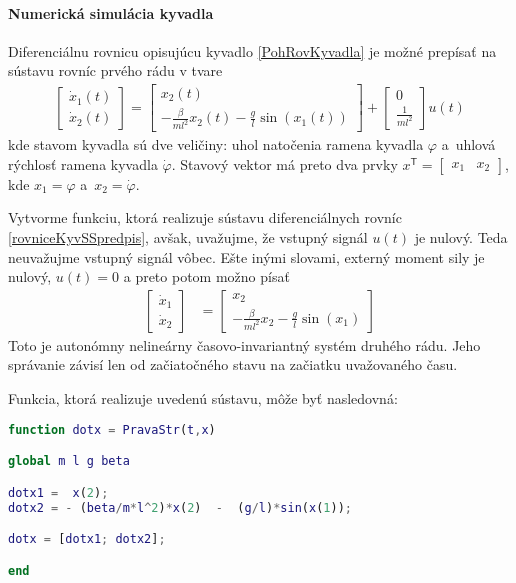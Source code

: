 \documentclass[a4paper, 10pt, ]{article}
\begin{document}
\paragraph{Numerická simulácia kyvadla}

Diferenciálnu rovnicu opisujúcu kyvadlo \eqref{PohRovKyvadla} je možné prepísať na sústavu rovníc prvého rádu v tvare
\begin{align} \label{rovniceKyvSSpredpis}
    \begin{bmatrix} \dot x_1(t) \\ \dot x_2(t)  \end{bmatrix} = \begin{bmatrix} x_2(t) \\ -\frac{\beta}{ml^2} x_2(t) - \frac{g}{l} \sin\left( x_1(t) \right)  \end{bmatrix} + \begin{bmatrix} 0 \\ \frac{1}{ml^2} \end{bmatrix} u(t)
\end{align}
kde stavom kyvadla sú dve veličiny: uhol natočenia ramena kyvadla $\varphi$ a~uhlová rýchlosť ramena kyvadla $\dot\varphi$. Stavový vektor má preto dva prvky $x^{\mathsf{T}} = \begin{bmatrix} x_1 & x_2	\end{bmatrix}$, kde $x_1 = \varphi$ a~$x_2 = \dot\varphi$.

Vytvorme funkciu, ktorá realizuje sústavu diferenciálnych rovníc \eqref{rovniceKyvSSpredpis}, avšak, uvažujme, že vstupný signál $u(t)$ je nulový. Teda neuvažujme vstupný signál vôbec. Ešte inými slovami, externý moment sily je nulový, $u(t) = 0$ a preto potom možno písať
\begin{align} \label{fajnVektRov0}
	\begin{bmatrix}
		\dot{x}_1 \\ \dot{x}_2
	\end{bmatrix}
	&=
	\begin{bmatrix}
		x_2 \\ - \frac{\beta}{ml^2} x_2 - \frac{g}{l} \sin(x_1)
	\end{bmatrix}
\end{align}
Toto je autonómny nelineárny časovo-invariantný systém druhého rádu. Jeho správanie závisí len od začiatočného stavu na začiatku uvažovaného času.

Funkcia, ktorá realizuje uvedenú sústavu, môže byť nasledovná:
\lstset{style=mystyle}
\begin{lstlisting}[language=Matlab, title=Celý súbor PravaStr.m]
function dotx = PravaStr(t,x)

global m l g beta

dotx1 =  x(2);
dotx2 = - (beta/m*l^2)*x(2)  -  (g/l)*sin(x(1));

dotx = [dotx1; dotx2];

end
\end{lstlisting}
\end{document}
